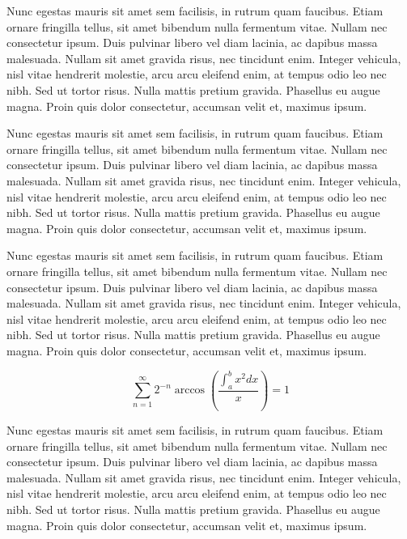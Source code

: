 Nunc egestas mauris sit amet sem facilisis, in rutrum quam faucibus. Etiam
ornare fringilla tellus, sit amet bibendum nulla fermentum vitae. Nullam nec
consectetur ipsum. Duis pulvinar libero vel diam lacinia, ac dapibus massa
malesuada. Nullam sit amet gravida risus, nec tincidunt enim. Integer vehicula,
nisl vitae hendrerit molestie, arcu arcu eleifend enim, at tempus odio leo nec
nibh. Sed ut tortor risus. Nulla mattis pretium gravida. Phasellus eu augue
magna. Proin quis dolor consectetur, accumsan velit et, maximus ipsum. 



Nunc egestas mauris sit amet sem facilisis, in rutrum quam faucibus. Etiam
ornare fringilla tellus, sit amet bibendum nulla fermentum vitae. Nullam nec
consectetur ipsum. Duis pulvinar libero vel diam lacinia, ac dapibus massa
malesuada. Nullam sit amet gravida risus, nec tincidunt enim. Integer vehicula,
nisl vitae hendrerit molestie, arcu arcu eleifend enim, at tempus odio leo nec
nibh. Sed ut tortor risus. Nulla mattis pretium gravida. Phasellus eu augue
magna. Proin quis dolor consectetur, accumsan velit et, maximus ipsum. 


Nunc egestas mauris sit amet sem facilisis, in rutrum quam faucibus. Etiam
ornare fringilla tellus, sit amet bibendum nulla fermentum vitae. Nullam nec
consectetur ipsum. Duis pulvinar libero vel diam lacinia, ac dapibus massa
malesuada. Nullam sit amet gravida risus, nec tincidunt enim. Integer vehicula,
nisl vitae hendrerit molestie, arcu arcu eleifend enim, at tempus odio leo nec
nibh. Sed ut tortor risus. Nulla mattis pretium gravida. Phasellus eu augue
magna. Proin quis dolor consectetur, accumsan velit et, maximus ipsum. 

\begin{equation}
\label{rownanie}
\sum_{n=1}^{\infty} 2^{-n} \arccos(\frac{\int_{a}^{b} x^2 dx}{x})  = 1
\end{equation}

Nunc egestas mauris sit amet sem facilisis, in rutrum quam faucibus. Etiam
ornare fringilla tellus, sit amet bibendum nulla fermentum vitae. Nullam nec
consectetur ipsum. Duis pulvinar libero vel diam lacinia, ac dapibus massa
malesuada. Nullam sit amet gravida risus, nec tincidunt enim. Integer vehicula,
nisl vitae hendrerit molestie, arcu arcu eleifend enim, at tempus odio leo nec
nibh. Sed ut tortor risus. Nulla mattis pretium gravida. Phasellus eu augue
magna. Proin quis dolor consectetur, accumsan velit et, maximus ipsum. 

\lstset{style=matlab}

